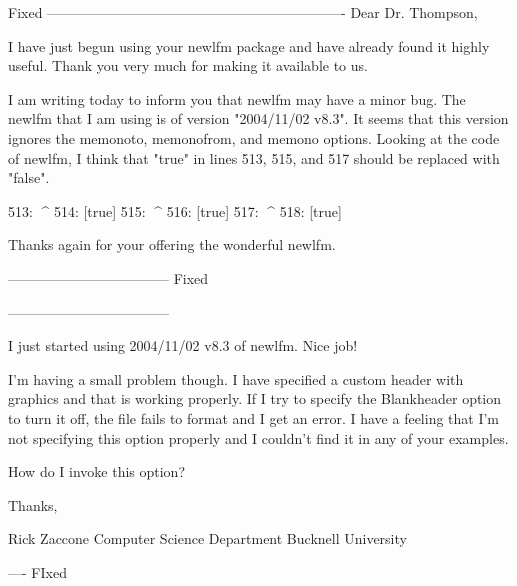Fixed
----------------------------------------------------------------
Dear Dr. Thompson,

I have just begun using your newlfm package and have already found it
highly useful. Thank you very much for making it available to us.

I am writing today to inform you that newlfm may have a minor bug. The
newlfm that I am using is of version "2004/11/02 v8.3". It seems that
this version ignores the memonoto, memonofrom, and memono
options. Looking at the code of newlfm, I think that "true" in lines
513, 515, and 517 should be replaced with "false".


  513:    {}%
                                                          ^^^^
  514: [true]{}%
  515:      {}%
                                                          ^^^^
  516: [true]{}%
  517:      {}%
                                                          ^^^^
  518: [true]{}%


Thanks again for your offering the wonderful newlfm.

-----------------------------------
Fixed 


-----------------------------------

I just started using 2004/11/02 v8.3 of newlfm.  Nice job!


I'm having a small problem though.  I have specified a custom header
with graphics and that is working properly.  If I try to specify the
Blankheader option to turn it off, the file fails to format and I get
an error.  I have a feeling that I'm not specifying this option
properly and I couldn't find it in any of your examples.


How do I invoke this option?


Thanks,


Rick Zaccone
Computer Science Department
Bucknell University

----
FIxed

